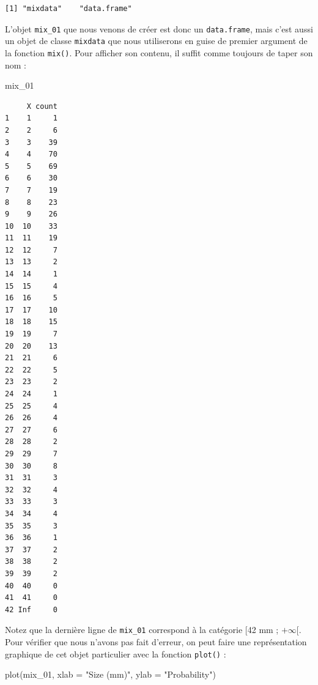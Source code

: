 \documentclass[
  french,
  a4paper,
  DIV=11,
  numbers=noendperiod,
  oneside]{scrreprt}
\newenvironment{Shaded}{}{}
\newcommand{\AttributeTok}[1]{\textcolor[rgb]{0.84,0.23,0.29}{#1}}
\newcommand{\FunctionTok}[1]{\textcolor[rgb]{0.44,0.26,0.76}{#1}}
\newcommand{\NormalTok}[1]{\textcolor[rgb]{0.14,0.16,0.18}{#1}}
\newcommand{\OtherTok}[1]{\textcolor[rgb]{0.44,0.26,0.76}{#1}}
\newcommand{\SpecialCharTok}[1]{\textcolor[rgb]{0.00,0.36,0.77}{#1}}
\newcommand{\StringTok}[1]{\textcolor[rgb]{0.01,0.18,0.38}{#1}}
\begin{document}
\begin{tcolorbox}
\begin{Shaded}
\end{Shaded}

\begin{verbatim}
[1] "mixdata"    "data.frame"
\end{verbatim}

L'objet \texttt{mix\_01} que nous venons de créer est donc un
\texttt{data.frame}, mais c'est aussi un objet de classe
\texttt{mixdata} que nous utiliserons en guise de premier argument de la
fonction \texttt{mix()}. Pour afficher son contenu, il suffit comme
toujours de taper son nom :

\begin{Shaded}
\begin{Highlighting}[]
\NormalTok{mix\_01}
\end{Highlighting}
\end{Shaded}

\begin{verbatim}
     X count
1    1     1
2    2     6
3    3    39
4    4    70
5    5    69
6    6    30
7    7    19
8    8    23
9    9    26
10  10    33
11  11    19
12  12     7
13  13     2
14  14     1
15  15     4
16  16     5
17  17    10
18  18    15
19  19     7
20  20    13
21  21     6
22  22     5
23  23     2
24  24     1
25  25     4
26  26     4
27  27     6
28  28     2
29  29     7
30  30     8
31  31     3
32  32     4
33  33     3
34  34     4
35  35     3
36  36     1
37  37     2
38  38     2
39  39     2
40  40     0
41  41     0
42 Inf     0
\end{verbatim}

Notez que la dernière ligne de \texttt{mix\_01} correspond à la
catégorie {[}42 mm ; \(+\infty\){[}. Pour vérifier que nous n'avons pas
fait d'erreur, on peut faire une représentation graphique de cet objet
particulier avec la fonction \texttt{plot()} :

\begin{Shaded}
\begin{Highlighting}[]
\FunctionTok{plot}\NormalTok{(mix\_01, }\AttributeTok{xlab =} \StringTok{"Size (mm)"}\NormalTok{, }\AttributeTok{ylab =} \StringTok{"Probability"}\NormalTok{)}
\end{Highlighting}
\end{Shaded}


\end{tcolorbox}
\end{document}
